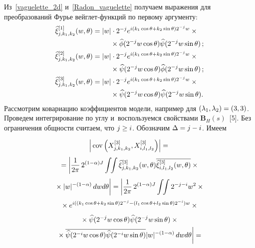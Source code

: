 \begin{multicols}{2}
Из~\eqref{vaguelette_2d} и~\eqref{Radon_vaguelette} получаем
выражения для преобразований Фурье вейг\-лет-функ\-ций по первому аргументу:
\begin{align*}
\widehat{\xi}_{j,k_1,k_2}^{[1]}(w,\theta) &= |w|\cdot 2^{-j}e^{i(k_1\cos\theta+k_2
\sin\theta) 2^{-j} w}\times{}\\
&\hspace*{9mm}{}\times \widehat{\phi}(2^{-j}w\cos\theta) \widehat{\psi}(2^{-j}w\sin\theta)\,;\\
\widehat{\xi}_{j,k_1,k_2}^{[2]}(w,\theta) &=
|w|\cdot 2^{-j}e^{i(k_1\cos\theta+k_2\sin\theta) 2^{-j} w}{}\times{}\\
&\hspace*{9mm}{}\times \widehat{\psi}(2^{-j}w\cos\theta) \widehat{\phi}(2^{-j}w\sin\theta)\,;\\
\widehat{\xi}_{j,k_1,k_2}^{[3]}(w,\theta) &=
|w|\cdot 2^{-j}e^{i(k_1\cos\theta+k_2\sin\theta) 2^{-j} w} \times{}\\
&\hspace*{9mm}{}\times\widehat{\psi}(2^{-j}w\cos\theta) \widehat{\psi}(2^{-j}w\sin\theta).
\end{align*}
Рассмотрим ковариацию коэффициентов модели, например для $(\lambda_1 ,\lambda_2)
\hm=(3,3)$. Проведем интегрирование по углу и~воспользуемся свойствами
$\mathbf{B}_H(s)$~[5]. Без ограничения общности считаем, что  $j \hm\geq i$.
Обозначим $\Delta \hm= j \hm- i$. Имеем

\columnbreak

\noindent
\begin{multline*}
\left\vert \,\cov\left(X_{j,k_1,k_2}^{[3]},X_{i,l_1,l_2}^{[3]}\right)\right\vert
={}\\[3pt]
{}= \left\vert \fr{1}{2\pi}\,2^{(1-\alpha)J}\int \!\!\int
\widehat{\xi}_{j,k_1,k_2}^{[3]}(w,\theta) \overline{\widehat{\xi}_{i,l_1,l_2}^{[3]}
(w,\theta)} \times{}\right.\\[3pt]
\left.{}\times |w|^{-(1-\alpha)}\, dw d\theta \vphantom{\fr{1}{2\pi}}
\right\vert=
\left\vert \fr{1}{2\pi}\,2^{(1-\alpha)J}\int \!\!\int
 2^{-j-i} w^2\times{}\right.\\[3pt]
\left. {}\times e^{i((k_1\cos\theta+k_2\sin\theta) 2^{-j} -
 (l_1\cos\theta+l_2\sin\theta) 2^{-i}) w} \times{}\right.
\\[3pt]
{}\times \widehat{\psi}(2^{-j}w\cos\theta)
\widehat{\psi}(2^{-j}w\sin\theta) \times{}\\
\left.{}\times \overline{ \widehat{\psi}(2^{-i}w\cos\theta)
\widehat{\psi}(2^{-i}w\sin\theta)} |w|^{-(1-\alpha)} \,d w d\theta
\vphantom{\fr{1}{2\pi}}\right\vert={}
\end{multline*}


\end{multicols}
